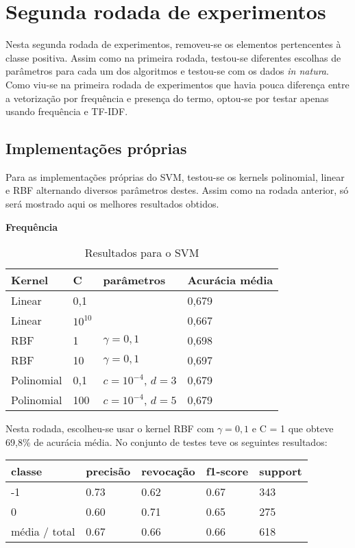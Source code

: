 \section{Segunda rodada de experimentos}
\label{sec:second_experiments}

Nesta segunda rodada de experimentos, removeu-se os elementos pertencentes à classe positiva.
Assim como na primeira rodada, testou-se diferentes escolhas de parâmetros para cada um dos
algoritmos e testou-se com os dados \textit{in natura}. Como viu-se na primeira rodada de experimentos
que havia pouca diferença entre a vetorização por frequência e presença do termo, optou-se por testar
apenas usando frequência e TF-IDF.

\subsection{Implementações próprias}

Para as implementações próprias do SVM, testou-se os kernels polinomial, linear e RBF alternando
diversos parâmetros destes. Assim como na rodada anterior, só será mostrado aqui os melhores resultados
obtidos. 

\textbf{Frequência}

\begin{table}[H]
	\centering
	\caption{Resultados para o SVM}
	\begin{tabular}{l l l l}
		\hline
		Kernel & C & parâmetros & Acurácia média \\
		\hline
		Linear & 0,1 & & 0,679 \\
		\hline
		Linear & $10^{10}$ & & 0,667 \\
		\hline
		RBF & 1 & $\gamma = 0,1$ & 0,698 \\
		\hline
		RBF & 10 & $\gamma = 0,1$ & 0,697 \\
		\hline
		Polinomial & 0,1 & $c = 10^{-4}$, $d = 3$ & 0,679 \\
		\hline
		Polinomial & 100 & $c = 10^{-4}$, $d = 5$ & 0,679 \\
		\hline
	\end{tabular}
\end{table}

Nesta rodada, escolheu-se usar o kernel RBF com $\gamma = 0,1$ e C = 1 que obteve 69,8\% de acurácia média. No
conjunto de testes teve os seguintes resultados:

\begin{table}[H]
	\centering
		\begin{tabular}{l | l | l | l | l}
		\hline
		classe  	&	precisão  &  revocação &  f1-score &  support \\
		\hline
		 -1    &   0.73   &   0.62   &   0.67   &    343 \\
		 \hline
          0    &   0.60   &   0.71   &   0.65   &    275 \\
		\hline
		média / total   &    0.67   &   0.66   &   0.66   &    618 \\
		\hline
	\end{tabular}
\end{table}


